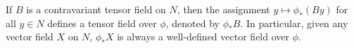 If $B$ is a contravariant tensor field on $N$, then the assignment $y \mapsto \phi_*(B y)$ for all $y \in N$ defines a tensor field over $\phi$, denoted by $\phi_* B$. In particular, given any vector field $X$ on $N$, $\phi_* X$ is always a well-defined vector field over $\phi$.
